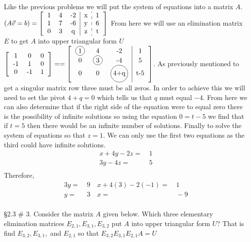 \documentclass[]{exam}
\newcommand {\mb}{\begin{bmatrix}\begin{tabular}{ccc}}
\newcommand {\me} {\end{tabular} \end{bmatrix}}
\newcommand*\circled[1]{\tikz[baseline=(char.base)]{
            \node[shape=circle,draw,inner sep=2pt] (char) {#1};}}
\begin{document}
\begin{questions}
	\begin{solution}
		Like the previous problems we will put the system of equations into a matrix $A$.  $(A\vec{v}=b)=\begin{bmatrix}\begin{tabular}{ccc|c:c}
		     1 & 4 & -2 & x & 1\\
		     1 & 7 & -6 & y & 6\\
		     0 & 3 & q & z & t
		\end{tabular}\end{bmatrix}$
		From here we will use an elimination matrix $E$ to get $A$ into upper triangular form $U$
        $\mb
            1 & 0 & 0 \\
            -1 & 1 & 0 \\
            0 & -1 & 1
        \me==\begin{bmatrix}\begin{tabular}{ccc|c}
            \circled{1} & 4 & -2 & 1 \\
            0 & \circled{3} & -4 & 5 \\
            0 & 0 & \circled{4+q} & t-5   
        \end{tabular}\end{bmatrix}$.
        As previously mentioned to get a singular matrix row three must be all zeros.  In order to achieve this we will need to set the pivot $4+q=0$ which tells us that $q$ must equal $-4$.  From here we can also determine that if the right side of the equation were to equal zero there is the possibility of infinite solutions so using the equation $0=t-5$ we find that if $t=5$ then there would be an infinite number of solutions.  Finally to solve the system of equations so that $z=1$. We can only use the first two equations as the third could have infinite solutions.
        \begin{align*}
            \text{$x+4y-2z=$} &\ 1 \\
            \text{$3y-4z=$} &\ 5 \\
        \end{align*} Therefore, 
        \begin{align*}
            \text{$3y=$} &\ 9 &\ \text{$x+4(3)-2(-1)=$} &\ 1 \\
            \text{$y=$} &\ 3 &\ \text{$x=$} &\ -9 \\
        \end{align*}
	\end{solution}
	
	\question \S 2.3 \# 3. Consider the matrix $A$ given below. Which three elementary elimination matrices $E_{2,1}, E_{3,1}, E_{3,2}$ put $A$ into upper triangular form $U$? That is find $E_{3,2}, E_{3,1},$ and $ E_{2,1}$ so that $E_{3,2} E_{3,1} E_{2,1} A = U $
	

\end{questions}
\end{document}
